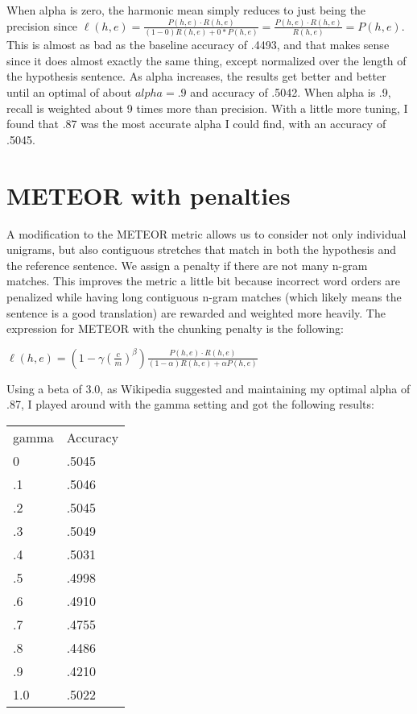 \documentclass[11pt]{article}
\begin{document}
When alpha is zero, the harmonic mean simply reduces to just being the precision since $\ell(h,e) = \frac{P(h,e)\cdot R(h,e)}{(1-0)R(h,e)+0*P(h,e)} = \frac{P(h,e)\cdot R(h,e)}{R(h, e)} = P(h,e)$. This is almost as bad as the baseline accuracy of .4493, and that makes sense since it does almost exactly the same thing, except normalized over the length of the hypothesis sentence. As alpha increases, the results get better and better until an optimal of about $alpha=.9$ and accuracy of .5042. When alpha is .9, recall is weighted about 9 times more than precision. With a little more tuning, I found that .87 was the most accurate alpha I could find, with an accuracy of .5045.

\section{METEOR with penalties}
A modification to the METEOR metric allows us to consider not only individual unigrams, but also contiguous stretches that match in both the hypothesis and the reference sentence. We assign a penalty if there are not many n-gram matches. This improves the metric a little bit because incorrect word orders are penalized while having long contiguous n-gram matches (which likely means the sentence is a good translation) are rewarded and weighted more heavily. The expression for METEOR with the chunking penalty is the following: \\
\begin{center}
$\ell(h,e) = \left(1 - \gamma \left(\frac{c}{m}\right)^\beta\right)\frac{P(h,e) \cdot R(h,e)}{(1-\alpha)R(h,e)+\alpha P(h,e)}$
\end{center}
Using a beta of 3.0, as Wikipedia suggested and maintaining my optimal alpha of .87, I played around with the gamma setting and got the following results: \\

\begin{table}[h]
\begin{tabular}{ll}
gamma & Accuracy \\
0     & .5045    \\
.1    & .5046    \\
.2    & .5045    \\
.3    & .5049    \\
.4    & .5031    \\
.5    & .4998    \\
.6    & .4910    \\
.7    & .4755    \\
.8    & .4486    \\
.9    & .4210    \\
1.0   & .5022   
\end{tabular}
\end{table}
\end{document}
